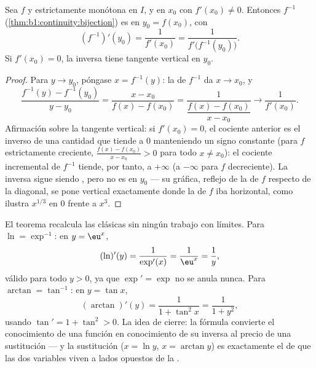\begin{theorem}\label{thm:b1:derivative:inverse}
Sea $f$  y estrictamente monótona en $I$, y  en
$x_0$ con $f'(x_0) \neq 0$. Entonces $f^{-1}$
(\cref{thm:b1:continuity:bijection}) es  en
$y_0 = f(x_0)$, con
\[
(f^{-1})'(y_0) = \frac{1}{f'(x_0)} = \frac{1}{f'\bigl(f^{-1}(y_0)\bigr)} .
\]
Si $f'(x_0) = 0$, la inversa tiene tangente vertical en $y_0$.
\end{theorem}

\begin{proof}
Para $y \to y_0$, póngase $x = f^{-1}(y)$: la  de $f^{-1}$
da $x \to x_0$, y
\[
\frac{f^{-1}(y) - f^{-1}(y_0)}{y - y_0}
= \frac{x - x_0}{f(x) - f(x_0)}
= \frac{1}{\dfrac{f(x) - f(x_0)}{x - x_0}}
\longrightarrow \frac{1}{f'(x_0)} .
\]
Afirmación sobre la tangente vertical: si $f'(x_0) = 0$, el cociente
anterior es el inverso de una cantidad que tiende a $0$ manteniendo
un signo constante (para $f$ estrictamente creciente,
$\frac{f(x) - f(x_0)}{x - x_0} > 0$ para todo $x \neq x_0$): el
cociente incremental de $f^{-1}$ tiende, por tanto, a $+\infty$ (a
$-\infty$ para $f$ decreciente). La inversa sigue siendo ,
pero no es  en $y_0$ --- su gráfica, reflejo de la de $f$
respecto de la diagonal, se pone vertical exactamente donde la de $f$
iba horizontal, como ilustra $x^{1/3}$ en $0$ frente a $x^3$.
\end{proof}

\begin{example}\label{ex:b1:derivative:inverseaction}
El teorema recalcula las  clásicas sin ningún trabajo con
límites. Para $\ln = \exp^{-1}$: en $y = \eu^x$,
\[
(\ln)'(y) = \frac{1}{\exp'(x)} = \frac{1}{\eu^{x}} = \frac1y ,
\]
válido para todo $y > 0$, ya que $\exp' = \exp$ no se anula nunca.
Para $\arctan = \tan^{-1}$: en $y = \tan x$,
\[
(\arctan)'(y) = \frac{1}{1 + \tan^2 x} = \frac{1}{1 + y^2} ,
\]
usando $\tan' = 1 + \tan^2 > 0$. La idea de cierre: la fórmula
convierte el conocimiento de una función en conocimiento de su
inversa al precio de una sustitución --- y la sustitución
($x = \ln y$, $x = \arctan y$) es exactamente el  de que las
dos variables viven a lados opuestos de la .
\end{example}

